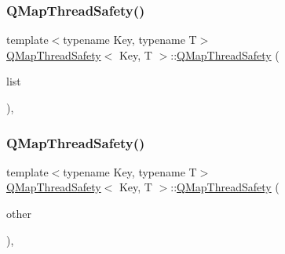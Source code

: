 \subsubsection{\texorpdfstring{Q\+Map\+Thread\+Safety()}{QMapThreadSafety()}\hspace{0.1cm}{\footnotesize\ttfamily [2/5]}}
{\footnotesize\ttfamily template$<$typename Key, typename T$>$ \\
\hyperlink{class_q_map_thread_safety}{Q\+Map\+Thread\+Safety}$<$ Key, T $>$\+::\hyperlink{class_q_map_thread_safety}{Q\+Map\+Thread\+Safety} (\begin{DoxyParamCaption}\item[{std\+::initializer\+\_\+list$<$ std\+::pair$<$ Key, T $>$$>$ \&}]{list }\end{DoxyParamCaption})\hspace{0.3cm}{\ttfamily [inline]}, {\ttfamily [explicit]}}

\mbox{\label{class_q_map_thread_safety_a368c8f4f05a48864209ab6ff5cf2f090}} 
\subsubsection{\texorpdfstring{Q\+Map\+Thread\+Safety()}{QMapThreadSafety()}\hspace{0.1cm}{\footnotesize\ttfamily [3/5]}}
{\footnotesize\ttfamily template$<$typename Key, typename T$>$ \\
\hyperlink{class_q_map_thread_safety}{Q\+Map\+Thread\+Safety}$<$ Key, T $>$\+::\hyperlink{class_q_map_thread_safety}{Q\+Map\+Thread\+Safety} (\begin{DoxyParamCaption}\item[{const Q\+Map$<$ Key, T $>$ \&}]{other }\end{DoxyParamCaption})\hspace{0.3cm}{\ttfamily [inline]}, {\ttfamily [explicit]}}

\mbox{\label{class_q_map_thread_safety_a1335c04a2df7eda320f7a778854531fc}} 
